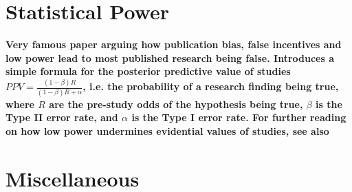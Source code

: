\documentclass[12pt]{scrartcl}
\begin{document}
\section{Statistical Power}

\begin{description}
  \item {}
  
  \item {}
  
  \item {}
  
  \item {}
  
  \item {}
  
  \item {}
  
  \item {}
  
  \item {}
  
    \textbf{Very famous paper arguing how publication bias, false incentives and low power lead to most published research being false. Introduces a simple formula for the posterior predictive value of studies $PPV = \frac{(1 - \beta)R}{(1 - \beta)R + \alpha}$, i.e. the probability of a research finding being true, where $R$ are the pre-study odds of the hypothesis being true, $\beta$ is the Type II error rate, and $\alpha$ is the Type I error rate. For further reading on how low power undermines evidential values of studies, see also \cite{button2013power}}
\end{description}


\section{Miscellaneous}
\end{document}
